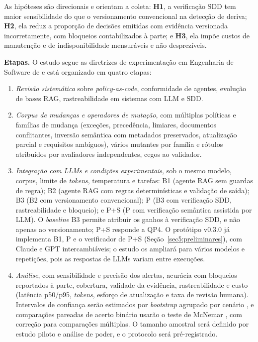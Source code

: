 \documentclass[12pt]{article}
\begin{document}
As hipóteses são direcionais e orientam a coleta: \textbf{H1}, a verificação SDD tem maior sensibilidade do que o versionamento convencional na detecção de deriva; \textbf{H2}, ela reduz a proporção de decisões emitidas com evidência versionada incorretamente, com bloqueios contabilizados à parte; e \textbf{H3}, ela impõe custos de manutenção e de indisponibilidade mensuráveis e não desprezíveis.

\textbf{Etapas.} O estudo segue as diretrizes de experimentação em Engenharia de Software de \cite{wohlin2012experimentation} e está organizado em quatro etapas:
\begin{enumerate}[noitemsep, topsep=3pt, leftmargin=1.5em]
  \item \textit{Revisão sistemática} \cite{kitchenham2007slr} sobre \textit{policy-as-code}, conformidade de agentes, evolução de bases RAG, rastreabilidade em sistemas com LLM e SDD.
  \item \textit{Corpus de mudanças e operadores de mutação}, com múltiplas políticas e famílias de mudança (exceções, precedência, limiares, documentos conflitantes, inversão semântica com metadados preservados, atualização parcial e requisitos ambíguos), vários mutantes por família e rótulos atribuídos por avaliadores independentes, cegos ao validador.
  \item \textit{Integração com LLMs e condições experimentais}, sob o mesmo modelo, corpus, limite de \textit{tokens}, temperatura e tarefas: B1 (agente RAG sem guardas de regra); B2 (agente RAG com regras determinísticas e validação de saída); B3 (B2 com versionamento convencional); P (B3 com verificação SDD, rastreabilidade e bloqueio); e P+S (P com verificação semântica assistida por LLM). O \textit{baseline} B3 permite atribuir os ganhos à verificação SDD, e não apenas ao versionamento; P+S responde a QP4. O protótipo v0.3.0 já implementa B1, P e o verificador de P+S (Seção~\ref{sec5:preliminares}), com Claude e GPT intercambiáveis; o estudo os ampliará para vários modelos e repetições, pois as respostas de LLMs variam entre execuções.
  \item \textit{Análise}, com sensibilidade e precisão dos alertas, acurácia com bloqueios reportados à parte, cobertura, validade da evidência, rastreabilidade e custo (latência p50/p95, \textit{tokens}, esforço de atualização e taxa de revisão humana). Intervalos de confiança serão estimados por \textit{bootstrap} agrupado por cenário \cite{efron1993bootstrap}, e comparações pareadas de acerto binário usarão o teste de McNemar \cite{mcnemar1947}, com correção para comparações múltiplas. O tamanho amostral será definido por estudo piloto e análise de poder, e o protocolo será pré-registrado.
\end{enumerate}
\end{document}
